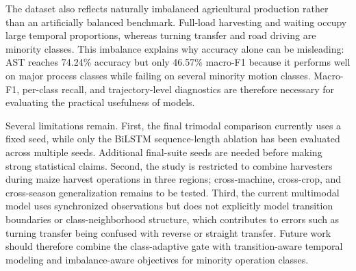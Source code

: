 The dataset also reflects naturally imbalanced agricultural production rather than an artificially balanced benchmark. Full-load harvesting and waiting occupy large temporal proportions, whereas turning transfer and road driving are minority classes. This imbalance explains why accuracy alone can be misleading: AST reaches 74.24\% accuracy but only 46.57\% macro-F1 because it performs well on major process classes while failing on several minority motion classes. Macro-F1, per-class recall, and trajectory-level diagnostics are therefore necessary for evaluating the practical usefulness of \task{} models.

Several limitations remain. First, the final trimodal comparison currently uses a fixed seed, while only the BiLSTM sequence-length ablation has been evaluated across multiple seeds. Additional final-suite seeds are needed before making strong statistical claims. Second, the study is restricted to combine harvesters during maize harvest operations in three regions; cross-machine, cross-crop, and cross-season generalization remains to be tested. Third, the current multimodal model uses synchronized observations but does not explicitly model transition boundaries or class-neighborhood structure, which contributes to errors such as turning transfer being confused with reverse or straight transfer. Future work should therefore combine the class-adaptive gate with transition-aware temporal modeling and imbalance-aware objectives for minority operation classes.
